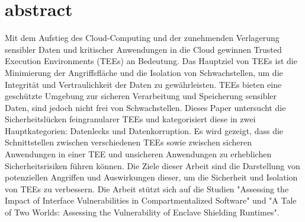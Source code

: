 \section*{abstract}
Mit dem Aufstieg des Cloud-Computing und der zunehmenden Verlagerung sensibler Daten und kritischer Anwendungen in die Cloud gewinnen Trusted Execution Environments (TEEs) an Bedeutung. Das Hauptziel von TEEs ist die Minimierung der Angriffsfläche und die Isolation von Schwachstellen, um die Integrität und Vertraulichkeit der Daten zu gewährleisten. TEEs bieten eine geschützte Umgebung zur sicheren Verarbeitung und Speicherung sensibler Daten, sind jedoch nicht frei von Schwachstellen. 
Dieses Paper untersucht die Sicherheitslücken feingranularer TEEs und kategorisiert diese in zwei Hauptkategorien: Datenlecks und Datenkorruption. Es wird gezeigt, dass die Schnittstellen zwischen verschiedenen TEEs sowie zwischen sicheren Anwendungen in einer TEE und unsicheren Anwendungen zu erheblichen Sicherheitsrisiken führen können.
Die Ziele dieser Arbeit sind die Darstellung von potenziellen Angriffen und Auswirkungen dieser, um die Sicherheit und Isolation von TEEs zu verbessern. Die Arbeit stützt sich auf die Studien "Assessing the Impact of Interface Vulnerabilities in Compartmentalized Software"\cite{CIVPaper} und "A Tale of Two Worlds: Assessing the Vulnerability of Enclave Shielding Runtimes"\cite{TEEPaper}.